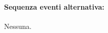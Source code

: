 \documentclass{article}
\begin{document}
	\paragraph{Sequenza eventi alternativa:}Nessuna.
\end{document}
